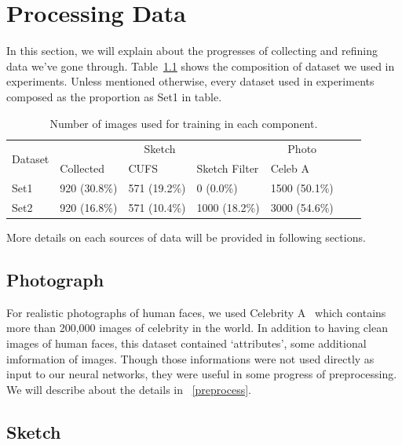 \chapter{Processing Data}\label{Ch:process_data}


In this section, we will explain about the progresses of collecting and refining data we've gone through. 
Table~\ref{TABLE:composition} shows the composition of dataset we used in experiments. Unless mentioned otherwise, every dataset used in experiments composed as the proportion as Set1 in table.

\begin{table}[h]
    \begin{center}
        \begin{tabular}{|l|l|l|l|l|l|l|}
          \hline
          \multirow{2}{*}{Dataset} &
            \multicolumn{3}{c}{Sketch} &
            \multicolumn{1}{c|}{Photo}\\
          & Collected & CUFS & Sketch Filter & Celeb A\\
          \hline
          Set1 & 920 (30.8\%) & 571 (19.2\%) & 0 (0.0\%) & 1500 (50.1\%) \\
          \hline
          Set2 & 920 (16.8\%) & 571 (10.4\%) & 1000 (18.2\%) & 3000 (54.6\%) \\
          \hline
        \end{tabular}
    \end{center}
    \caption{Number of images used for training in each component.}\label{TABLE:composition}
\end{table}

More details on each sources of data will be provided in following sections.

\section{Photograph}

For realistic photographs of human faces, we used Celebrity A~\cite{liu2015faceattributes} which contains more than 200,000 images of celebrity in the world. In addition to having clean images of human faces, this dataset contained `attributes', some additional imformation of images. Though those informations were not used directly as input to our neural networks, they were useful in some progress of preprocessing. We will describe about the details in ~\ref{preprocess}.

\section{Sketch}

